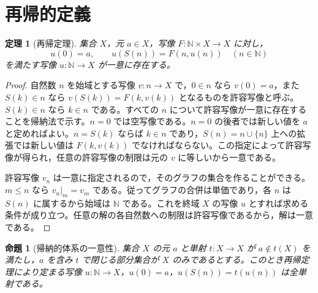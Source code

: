 \documentclass[a5paper,10pt,dvipdfmx]{jsarticle}
\theoremstyle{definition}
\theoremstyle{plain}
\newtheorem{prop}[ruledef]{命題}
\newtheorem{thm}[ruledef]{定理}
\begin{document}
\section{再帰的定義}
\begin{thm}[再帰定理]\label{k105}
集合 $X$，元 $a\in X$，写像 $F\colon\mathbb N\times X\to X$ に対し，
\[ u(0)=a,\qquad u(S(n))=F(n,u(n))\quad(n\in\mathbb N) \]
を満たす写像 $u\colon\mathbb N\to X$ が一意に存在する。
\end{thm}
\begin{proof}
自然数 $n$ を始域とする写像 $v\colon n\to X$ で，$0\in n$ なら $v(0)=a$，また $S(k)\in n$ なら $v(S(k))=F(k,v(k))$ となるものを許容写像と呼ぶ。$S(k)\in n$ なら $k\in n$ である。すべての $n$ について許容写像が一意に存在することを帰納法で示す。$n=0$ では空写像である。$n=0$ の後者では新しい値を $a$ と定めればよい。$n=S(k)$ ならば $k\in n$ であり，$S(n)=n\cup\{n\}$ 上への拡張では新しい値は $F(k,v(k))$ でなければならない。この指定によって許容写像が得られ，任意の許容写像の制限は元の $v$ に等しいから一意である。

許容写像 $v_n$ は一意に指定されるので，そのグラフの集合を作ることができる。$m\leq n$ なら $v_n|_m=v_m$ である。従ってグラフの合併は単価であり，各 $n$ は $S(n)$ に属するから始域は $\mathbb N$ である。これを終域 $X$ の写像 $u$ とすれば求める条件が成り立つ。任意の解の各自然数への制限は許容写像であるから，解は一意である。
\end{proof}
\begin{prop}[帰納的体系の一意性]\label{k106}
集合 $X$ の元 $a$ と単射 $t\colon X\to X$ が $a\notin t(X)$ を満たし，$a$ を含み $t$ で閉じる部分集合が $X$ のみであるとする。このとき再帰定理により定まる写像 $u\colon\mathbb N\to X$，$u(0)=a$，$u(S(n))=t(u(n))$ は全単射である。
\end{prop}
\end{document}
